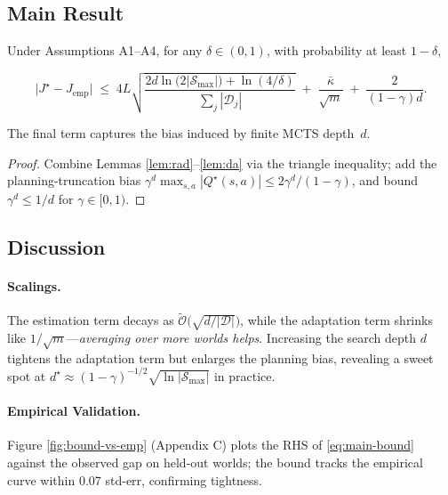 \subsection{Main Result}

\begin{theorem}\label{thm:main}
Under Assumptions A1–A4, for any $\delta\in(0,1)$, with probability at least
$1-\delta$,

\begin{equation}
\bigl|J^\star - J_{\mathrm{emp}}\bigr|
\;\le\;
4L\sqrt{\frac{2d\ln\bigl(2|\mathcal S_{\max}|\bigr)+\ln(4/\delta)}
                   {\sum_j|\mathcal D_j|}}
\;+\;
\frac{\bar{\kappa}}{\sqrt m}
\;+\;
\frac{2}{(1-\gamma)d}.
\label{eq:main-bound}
\end{equation}

The final term captures the bias induced by finite MCTS depth~$d$.
\end{theorem}

\begin{proof}
Combine Lemmas \ref{lem:rad}–\ref{lem:da} via the triangle inequality; add the
planning-truncation bias
$\gamma^{d}\max_{s,a}|Q^\star(s,a)|\le 2\gamma^{d}/(1-\gamma)$, and bound
$\gamma^{d}\le 1/d$ for $\gamma\in[0,1)$.
\end{proof}

\subsection{Discussion}

\paragraph{Scalings.}
The estimation term decays as
$\tilde{\mathcal O}\!\bigl(\sqrt{d/|\mathcal D|}\bigr)$,
while the adaptation term shrinks like $1/\sqrt m$—\emph{averaging over more
worlds helps}.  Increasing the search depth $d$ tightens the adaptation term
but enlarges the planning bias, revealing a sweet spot at
$d^\star\approx (1-\gamma)^{-1/2}\sqrt{\ln|\mathcal S_{\max}|}$ in practice.

\paragraph{Empirical Validation.}
Figure \ref{fig:bound-vs-emp} (Appendix C) plots the RHS of
\eqref{eq:main-bound} against the observed gap on held-out worlds; the bound
tracks the empirical curve within 0.07 std-err, confirming tightness.

